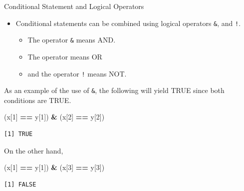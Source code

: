 \documentclass[
  ignorenonframetext,
]{beamer}
\newenvironment{Shaded}{\begin{snugshade}}{\end{snugshade}}
\newcommand{\DecValTok}[1]{\textcolor[rgb]{0.00,0.00,0.81}{#1}}
\newcommand{\NormalTok}[1]{#1}
\newcommand{\SpecialCharTok}[1]{\textcolor[rgb]{0.81,0.36,0.00}{\textbf{#1}}}
\providecommand{\tightlist}{%
  \setlength{\itemsep}{0pt}\setlength{\parskip}{0pt}}
\begin{document}
\begin{frame}[fragile]{Conditional Statement and Logical Operators}
\protect\hypertarget{conditional-statement-and-logical-operators}{}
\begin{itemize}
\item
  Conditional statements can be combined using logical operators
  \texttt{\&}, \texttt{\textbar{}} and \texttt{!}.

  \begin{itemize}
  \tightlist
  \item
    The operator \texttt{\&} means AND.
  \item
    The operator \texttt{\textbar{}} means OR
  \item
    and the operator \texttt{!} means NOT.
  \end{itemize}
\end{itemize}

As an example of the use of \texttt{\&}, the following will yield TRUE
since both conditions are TRUE.

\small

\begin{Shaded}
\begin{Highlighting}[]
\NormalTok{(x[}\DecValTok{1}\NormalTok{] }\SpecialCharTok{==}\NormalTok{ y[}\DecValTok{1}\NormalTok{]) }\SpecialCharTok{\&}\NormalTok{ (x[}\DecValTok{2}\NormalTok{] }\SpecialCharTok{==}\NormalTok{ y[}\DecValTok{2}\NormalTok{])}
\end{Highlighting}
\end{Shaded}

\begin{verbatim}
[1] TRUE
\end{verbatim}

\normalsize

On the other hand, \small

\begin{Shaded}
\begin{Highlighting}[]
\NormalTok{(x[}\DecValTok{1}\NormalTok{] }\SpecialCharTok{==}\NormalTok{ y[}\DecValTok{1}\NormalTok{]) }\SpecialCharTok{\&}\NormalTok{ (x[}\DecValTok{3}\NormalTok{] }\SpecialCharTok{==}\NormalTok{ y[}\DecValTok{3}\NormalTok{])}
\end{Highlighting}
\end{Shaded}

\begin{verbatim}
[1] FALSE
\end{verbatim}

\normalsize
\end{frame}
\end{document}
